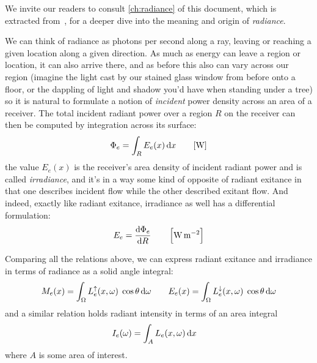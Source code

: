 We invite our readers to consult \cref{ch:radiance} of this document, which is extracted
from~\cite{nicodemus63}, for a deeper dive into the meaning and 
origin of \textsl{\gls{radiance}}. 

We can think of \gls{radiance} as photons per second along 
a ray, leaving or reaching a given location along a given direction.
As much as energy can leave a region or location, it can also
arrive there, and as before this also can vary across our region 
(imagine the light cast by our stained glass window from before onto a floor,
or the dappling of light and shadow you'd have when standing under a tree)
so it is natural to formulate a notion of \emph{incident} power density across 
an area of a receiver. 
The total incident radiant power over a region $R$ on the receiver can then be computed by
integration across its surface:
\begin{equation}
	\Phi_e = \int_{R} E_e(x) \d x \qquad [\unit{\watt}]
\end{equation}
the value $E_e(x)$ is the receiver's area density of incident radiant power and
is called \textit{irradiance}, and it's in a way some kind of opposite of radiant exitance
in that one describes incident flow while the other described exitant flow.
And indeed, exactly like radiant exitance, irradiance as well has a differential formulation:
\begin{equation}
	E_e = \frac{\d\Phi_e}{\d R} \qquad \left[\unit{\watt\per\square\meter}\right]
\end{equation}

Comparing all the relations above, we can express radiant exitance 
and irradiance in terms of radiance as a solid angle integral:
\begin{equation}
	M_e(x) = \int_\Omega L_e^\uparrow(x,\omega) \;\cos\theta \mathop{}\!\mathrm{d}\omega \qquad
	E_e(x) = \int_\Omega L_e^\downarrow(x,\omega) \;\cos\theta \mathop{}\!\mathrm{d}\omega
\end{equation}
and a similar relation holds radiant intensity in terms of an area integral
\begin{equation}
	I_e(\omega) = \int_A L_e(x,\omega) \mathop{}\!\mathrm{d} x \quad
\end{equation}
where $A$ is some area of interest.

